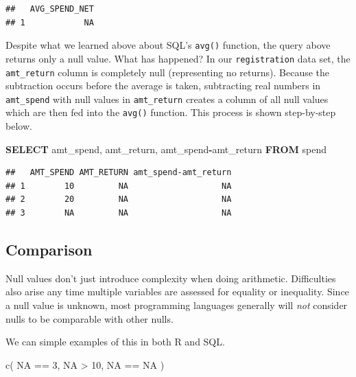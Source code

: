 \documentclass[
]{krantz}
\makeatletter
\newenvironment{Shaded}{\begin{snugshade}}{\end{snugshade}}
\newcommand{\ConstantTok}[1]{\textcolor[rgb]{0,0,0}{#1}}
\newcommand{\DecValTok}[1]{\textcolor[rgb]{0.06,0.06,0.06}{#1}}
\newcommand{\FunctionTok}[1]{\textcolor[rgb]{0,0,0}{#1}}
\newcommand{\KeywordTok}[1]{\textcolor[rgb]{0.27,0.27,0.27}{\textbf{#1}}}
\newcommand{\NormalTok}[1]{#1}
\newcommand{\OperatorTok}[1]{\textcolor[rgb]{0.43,0.43,0.43}{\textbf{#1}}}
\newcommand{\SpecialCharTok}[1]{\textcolor[rgb]{0,0,0}{#1}}
\newenvironment{kframe}{%
\medskip{}
\setlength{\fboxsep}{.8em}
 \def\at@end@of@kframe{}%
 \ifinner\ifhmode%
  \def\at@end@of@kframe{\end{minipage}}%
  \begin{minipage}{\columnwidth}%
 \fi\fi%
 \def\FrameCommand##1{\hskip\@totalleftmargin \hskip-\fboxsep
 \colorbox{shadecolor}{##1}\hskip-\fboxsep
     \hskip-\linewidth \hskip-\@totalleftmargin \hskip\columnwidth}%
 \MakeFramed {\advance\hsize-\width
   \@totalleftmargin\z@ \linewidth\hsize
   \@setminipage}}%
 {\par\unskip\endMakeFramed%
 \at@end@of@kframe}
\renewenvironment{Shaded}{\begin{kframe}}{\end{kframe}}
\makeatother
\begin{document}
\begin{verbatim}
##   AVG_SPEND_NET
## 1            NA
\end{verbatim}

Despite what we learned above about SQL's \texttt{avg()} function, the query above returns only a null value.
What has happened?
In our \texttt{registration} data set, the \texttt{amt\_return} column is completely null (representing no returns).
Because the subtraction occurs before the average is taken, subtracting real numbers in \texttt{amt\_spend} with null values in \texttt{amt\_return} creates a column of all null values which are then fed into the \texttt{avg()} function.
This process is shown step-by-step below.

\begin{Shaded}
\begin{Highlighting}[]
\KeywordTok{SELECT}
\NormalTok{  amt\_spend, }
\NormalTok{  amt\_return, }
\NormalTok{  amt\_spend}\OperatorTok{{-}}\NormalTok{amt\_return }
\KeywordTok{FROM}\NormalTok{ spend}
\end{Highlighting}
\end{Shaded}

\begin{verbatim}
##   AMT_SPEND AMT_RETURN amt_spend-amt_return
## 1        10         NA                   NA
## 2        20         NA                   NA
## 3        NA         NA                   NA
\end{verbatim}

\hypertarget{comparison}{%
\subsection{Comparison}\label{comparison}}

Null values don't just introduce complexity when doing arithmetic. Difficulties also arise any time multiple variables are assessed for equality or inequality. Since a null value is unknown, most programming languages generally will \emph{not} consider nulls to be comparable with other nulls.

We can simple examples of this in both R and SQL.

\begin{Shaded}
\begin{Highlighting}[]
\FunctionTok{c}\NormalTok{(}
  \ConstantTok{NA} \SpecialCharTok{==} \DecValTok{3}\NormalTok{, }
  \ConstantTok{NA} \SpecialCharTok{\textgreater{}} \DecValTok{10}\NormalTok{, }
  \ConstantTok{NA} \SpecialCharTok{==} \ConstantTok{NA}
\NormalTok{  )}
\end{Highlighting}
\end{Shaded}
\end{document}
